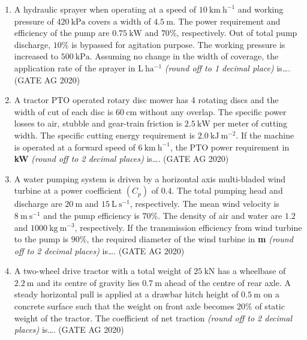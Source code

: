 \documentclass[journal]{IEEEtran}
\begin{document}
\begin{enumerate}
\medskip

\item 
A hydraulic sprayer when operating at a speed of $10~\mathrm{km~h^{-1}}$ and working pressure of $420~\mathrm{kPa}$ covers a width of $4.5~\mathrm{m}$. The power requirement and efficiency of the pump are $0.75~\mathrm{kW}$ and $70\%$, respectively. Out of total pump discharge, $10\%$ is bypassed for agitation purpose. The working pressure is increased to $500~\mathrm{kPa}$. Assuming no change in the width of coverage, the application rate of the sprayer in $\mathrm{L~ha^{-1}}$ \emph{(round off to 1 decimal place)} is\dots.
\hfill(GATE AG 2020)\\

\medskip

\item 
A tractor PTO operated rotary disc mower has 4 rotating discs and the width of cut of each disc is $60~\mathrm{cm}$ without any overlap. The specific power losses to air, stubble and gear-train friction is $2.5~\mathrm{kW}$ per meter of cutting width. The specific cutting energy requirement is $2.0~\mathrm{kJ~m^{-2}}$. If the machine is operated at a forward speed of $6~\mathrm{km~h^{-1}}$, the PTO power requirement in \textbf{kW} \emph{(round off to 2 decimal places)} is\dots.
\hfill(GATE AG 2020)\\

\medskip

\item 
A water pumping system is driven by a horizontal axis multi-bladed wind turbine at a power coefficient $(C_p)$ of $0.4$. The total pumping head and discharge are $20~\mathrm{m}$ and $15~\mathrm{L~s^{-1}}$, respectively. The mean wind velocity is $8~\mathrm{m~s^{-1}}$ and the pump efficiency is $70\%$. The density of air and water are $1.2$ and $1000~\mathrm{kg~m^{-3}}$, respectively. If the transmission efficiency from wind turbine to the pump is $90\%$, the required diameter of the wind turbine in \textbf{m} \emph{(round off to 2 decimal places)} is\dots.
\hfill(GATE AG 2020)\\

\medskip

\item 
A two-wheel drive tractor with a total weight of $25~\mathrm{kN}$ has a wheelbase of $2.2~\mathrm{m}$ and its centre of gravity lies $0.7~\mathrm{m}$ ahead of the centre of rear axle. A steady horizontal pull is applied at a drawbar hitch height of $0.5~\mathrm{m}$ on a concrete surface such that the weight on front axle becomes $20\%$ of static weight of the tractor. The coefficient of net traction \emph{(round off to 2 decimal places)} is\dots.
\hfill(GATE AG 2020)\\


\end{enumerate}
\end{document}
